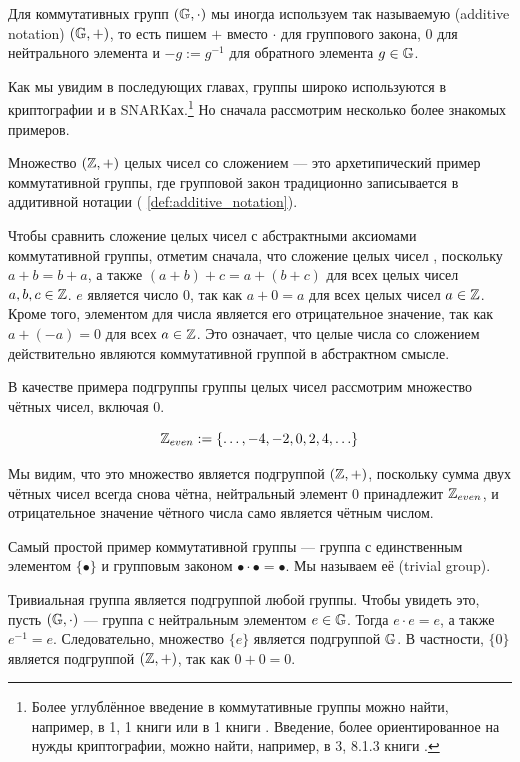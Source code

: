 \begin{notation}\label{def:additive_notation}
Для коммутативных групп $(\mathbb{G},\cdot)$ мы иногда используем так называемую  (additive notation) $(\mathbb{G},+)$, то есть пишем $+$ вместо $\cdot$ для группового закона, $0$ для нейтрального элемента и $-g:=g^{-1}$ для обратного элемента $g\in\mathbb{G}$.
\end{notation}
Как мы увидим в последующих главах, группы широко используются в криптографии и в SNARKах.\footnote{Более углублённое введение в коммутативные группы можно найти, например, в \chaptname{} 1, \secname{} 1 книги \cite{nieder-1986} или в \chaptname{} 1 книги \cite{fuchs-2015}. Введение, более ориентированное на нужды криптографии, можно найти, например, в \chaptname{} 3, \secname{} 8.1.3 книги \cite{katz-2007}.} Но сначала рассмотрим несколько более знакомых примеров.

\begin{example}
\label{example:group_of_integers}
Множество $(\mathbb{Z},+)$ целых чисел со сложением — это архетипический пример коммутативной группы, где групповой закон традиционно записывается в аддитивной нотации (\notationname{} \ref{def:additive_notation}). 

Чтобы сравнить сложение целых чисел с абстрактными аксиомами коммутативной группы, отметим сначала, что сложение целых чисел , поскольку $a+b = b+a$, а также $(a+b)+c=a+(b+c)$ для всех целых чисел $a,b,c\in \mathbb{Z}$.  $e$ является число $0$, так как $a+0=a$ для всех целых чисел $a\in \mathbb{Z}$. Кроме того,  элементом для числа является его отрицательное значение, так как $a+(-a)=0$ для всех $a\in\mathbb{Z}$. Это означает, что целые числа со сложением действительно являются коммутативной группой в абстрактном смысле.

В качестве примера подгруппы группы целых чисел рассмотрим множество чётных чисел, включая $0$. 

$$\mathbb{Z}_{even}:=\{\ldots,-4,-2,0,2,4,\ldots\}$$

Мы видим, что это множество является подгруппой $(\mathbb{Z},+)$, поскольку сумма двух чётных чисел всегда снова чётна, нейтральный элемент $0$ принадлежит $\mathbb{Z}_{even}$, и отрицательное значение чётного числа само является чётным числом. 
\end{example}
\begin{example}\label{example:trivial_group}
Самый простой пример коммутативной группы — группа с единственным элементом $\{\bullet\}$ и групповым законом $\bullet\cdot \bullet=\bullet$. Мы называем её  (trivial group).

Тривиальная группа является подгруппой любой группы. Чтобы увидеть это, пусть $(\mathbb{G},\cdot)$ — группа с нейтральным элементом $e\in\mathbb{G}$. Тогда $e\cdot e = e$, а также $e^{-1}=e$. Следовательно, множество $\{e\}$ является подгруппой $\mathbb{G}$. В частности, $\{0\}$ является подгруппой $(\mathbb{Z},+)$, так как $0+0=0$.
\end{example}

